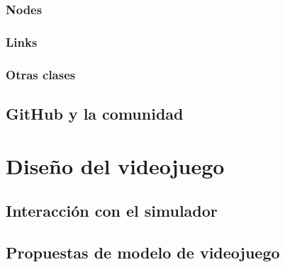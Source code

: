 \subsubsection{Nodes}
\subsubsection{Links}
\subsubsection{Otras clases}
\subsection{GitHub y la comunidad}


\section{Diseño del videojuego}
\subsection{Interacción con el simulador}
\subsection{Propuestas de modelo de videojuego}



